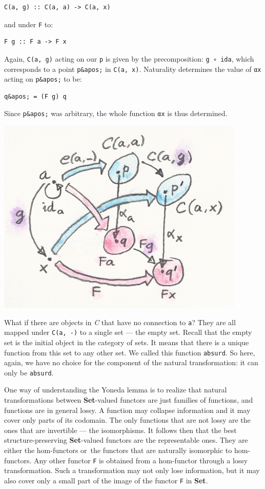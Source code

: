 \begin{verbatim}
C(a, g) :: C(a, a) -> C(a, x)
\end{verbatim}

and under \texttt{F} to:

\begin{verbatim}
F g :: F a -> F x
\end{verbatim}

Again, \texttt{C(a,\ g)} acting on our \texttt{p} is given by the
precomposition: \texttt{g\ ∘\ ida}, which corresponds to a point
\texttt{p\&apos;} in \texttt{C(a,\ x)}. Naturality determines the value
of \texttt{αx} acting on \texttt{p\&apos;} to be:

\begin{verbatim}
q&apos; = (F g) q
\end{verbatim}

Since \texttt{p\&apos;} was arbitrary, the whole function \texttt{αx} is
thus determined.

\includegraphics{images/yoneda5.png}

What if there are objects in \emph{C} that have no connection to
\texttt{a}? They are all mapped under \texttt{C(a,\ -)} to a single set
--- the empty set. Recall that the empty set is the initial object in
the category of sets. It means that there is a unique function from this
set to any other set. We called this function \texttt{absurd}. So here,
again, we have no choice for the component of the natural
transformation: it can only be \texttt{absurd}.

One way of understanding the Yoneda lemma is to realize that natural
transformations between \textbf{Set}-valued functors are just families
of functions, and functions are in general lossy. A function may
collapse information and it may cover only parts of its codomain. The
only functions that are not lossy are the ones that are invertible ---
the isomorphisms. It follows then that the best structure-preserving
\textbf{Set}-valued functors are the representable ones. They are either
the hom-functors or~the functors that are naturally isomorphic to
hom-functors. Any other functor \texttt{F} is obtained from a
hom-functor through a lossy transformation. Such a transformation may
not only lose information, but it may also cover only a small part of
the image of the functor \texttt{F} in \textbf{Set}.

